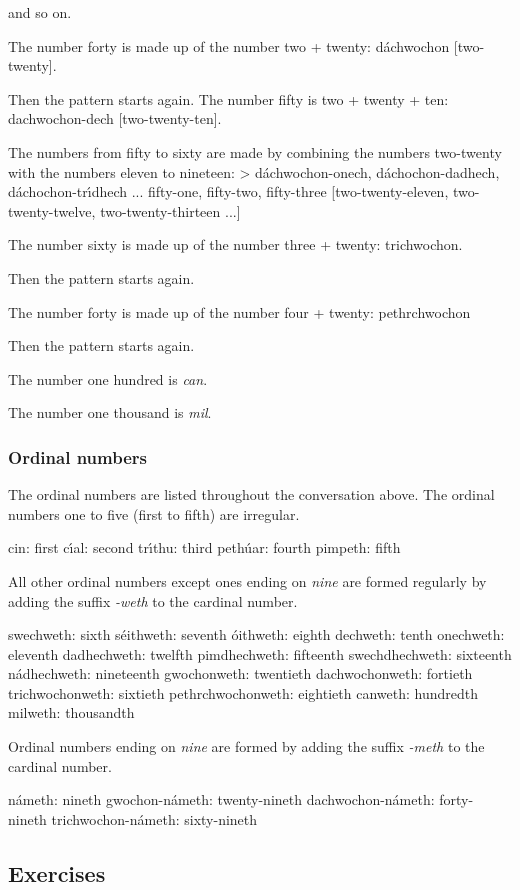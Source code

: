 and so on.

The number forty is made up of the number two + twenty: d\'{a}chwochon [two-twenty].

Then the pattern starts again. The number fifty is two + twenty + ten: dachwochon-dech [two-twenty-ten].

The numbers from fifty to sixty are made by combining the numbers two-twenty with the numbers eleven to nineteen:
> d\'{a}chwochon-onech, d\'{a}chochon-dadhech, d\'{a}chochon-tr\'{\i}dhech ...
fifty-one, fifty-two, fifty-three
[two-twenty-eleven, two-twenty-twelve, two-twenty-thirteen ...]

The number sixty is made up of the number three + twenty: trichwochon.

Then the pattern starts again.

The number forty is made up of the number four + twenty: pethrchwochon

Then the pattern starts again.

The number one hundred is \textit{can}.

The number one thousand is \textit{mil}.

\subsubsection{Ordinal numbers}

The ordinal numbers are listed throughout the conversation above. The ordinal numbers one to five (first to fifth) are irregular.

cin: first
c\'{\i}al: second
tr\'{\i}thu: third
peth\'{u}ar: fourth
pimpeth: fifth

All other ordinal numbers except ones ending on \textit{nine} are formed regularly by adding the suffix \textit{-weth} to the cardinal number.

swechweth: sixth
s\'{e}ithweth: seventh
\'{o}ithweth: eighth
dechweth: tenth
onechweth: eleventh
dadhechweth: twelfth
pimdhechweth: fifteenth
swechdhechweth: sixteenth
n\'{a}dhechweth: nineteenth
gwochonweth: twentieth
dachwochonweth: fortieth
trichwochonweth: sixtieth
pethrchwochonweth: eightieth
canweth: hundredth
milweth: thousandth

Ordinal numbers ending on \textit{nine} are formed by adding the suffix \textit{-meth} to the cardinal number.

n\'{a}meth: nineth
gwochon-n\'{a}meth: twenty-nineth
dachwochon-n\'{a}meth: forty-nineth
trichwochon-n\'{a}meth: sixty-nineth

\subsection{Exercises}


